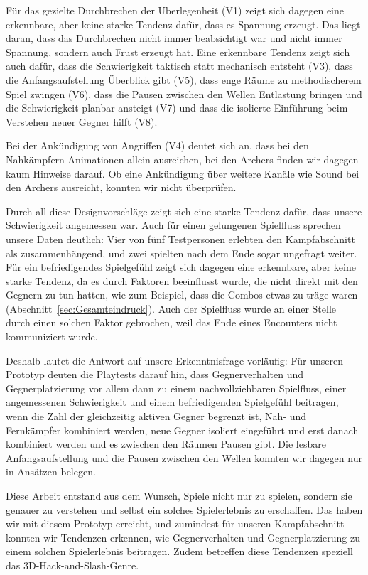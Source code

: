 \documentclass[../Main.tex]{subfiles}
\begin{document}
Für das gezielte Durchbrechen der Überlegenheit (V1) zeigt sich dagegen eine erkennbare, aber keine starke Tendenz dafür, dass es Spannung erzeugt. Das liegt daran, dass das Durchbrechen nicht immer beabsichtigt war und nicht immer Spannung, sondern auch Frust erzeugt hat. Eine erkennbare Tendenz zeigt sich auch dafür, dass die Schwierigkeit taktisch statt mechanisch entsteht (V3), dass die Anfangsaufstellung Überblick gibt (V5), dass enge Räume zu methodischerem Spiel zwingen (V6), dass die Pausen zwischen den Wellen Entlastung bringen und die Schwierigkeit planbar ansteigt (V7) und dass die isolierte Einführung beim Verstehen neuer Gegner hilft (V8).

Bei der Ankündigung von Angriffen (V4) deutet sich an, dass bei den Nahkämpfern Animationen allein ausreichen, bei den Archers finden wir dagegen kaum Hinweise darauf. Ob eine Ankündigung über weitere Kanäle wie Sound bei den Archers ausreicht, konnten wir nicht überprüfen.

Durch all diese Designvorschläge zeigt sich eine starke Tendenz dafür, dass unsere Schwierigkeit angemessen war. Auch für einen gelungenen Spielfluss sprechen unsere Daten deutlich: Vier von fünf Testpersonen erlebten den Kampfabschnitt als zusammenhängend, und zwei spielten nach dem Ende sogar ungefragt weiter. Für ein befriedigendes Spielgefühl zeigt sich dagegen eine erkennbare, aber keine starke Tendenz, da es durch Faktoren beeinflusst wurde, die nicht direkt mit den Gegnern zu tun hatten, wie zum Beispiel, dass die Combos etwas zu träge waren (Abschnitt~\ref{sec:Gesamteindruck}). Auch der Spielfluss wurde an einer Stelle durch einen solchen Faktor gebrochen, weil das Ende eines Encounters nicht kommuniziert wurde.

Deshalb lautet die Antwort auf unsere Erkenntnisfrage vorläufig: Für unseren Prototyp deuten die Playtests darauf hin, dass Gegnerverhalten und Gegnerplatzierung vor allem dann zu einem nachvollziehbaren Spielfluss, einer angemessenen Schwierigkeit und einem befriedigenden Spielgefühl beitragen, wenn die Zahl der gleichzeitig aktiven Gegner begrenzt ist, Nah- und Fernkämpfer kombiniert werden, neue Gegner isoliert eingeführt und erst danach kombiniert werden und es zwischen den Räumen Pausen gibt. Die lesbare Anfangsaufstellung und die Pausen zwischen den Wellen konnten wir dagegen nur in Ansätzen belegen.

Diese Arbeit entstand aus dem Wunsch, Spiele nicht nur zu spielen, sondern sie genauer zu verstehen und selbst ein solches Spielerlebnis zu erschaffen. Das haben wir mit diesem Prototyp erreicht, und zumindest für unseren Kampfabschnitt konnten wir Tendenzen erkennen, wie Gegnerverhalten und Gegnerplatzierung zu einem solchen Spielerlebnis beitragen. Zudem betreffen diese Tendenzen speziell das 3D-Hack-and-Slash-Genre.
\end{document}

